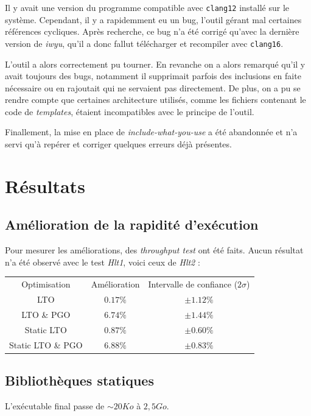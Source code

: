 \documentclass[a4paper]{report}
\begin{document}
Il y avait une version du programme compatible avec \verb'clang12' installé sur le système.
Cependant, il y a rapidemment eu un bug, l'outil gérant mal certaines références cycliques.
Après recherche, ce bug n'a été corrigé qu'avec la dernière version de \emph{iwyu}, qu'il a donc fallut télécharger et recompiler avec \verb'clang16'.

L'outil a alors correctement pu tourner.
En revanche on a alors remarqué qu'il y avait toujours des bugs, notamment il supprimait parfois des inclusions en faite nécessaire ou en rajoutait qui ne servaient pas directement.
De plus, on a pu se rendre compte que certaines architecture utilisés, comme les fichiers contenant le code de \emph{templates}, étaient incompatibles avec le principe de l'outil.

Finallement, la mise en place de \emph{include-what-you-use} a été abandonnée et n'a servi qu'à repérer et corriger quelques erreurs déjà présentes.

\chapter{Résultats}

\section{Amélioration de la rapidité d'exécution}
Pour mesurer les améliorations, des \emph{throughput test} ont été faits.
Aucun résultat n'a été observé avec le test \emph{Hlt1}, voici ceux de \emph{Hlt2} :

\begin{center}
    \begin{tabular}{ c c c }
        Optimisation      & Amélioration & Intervalle de confiance ($2\sigma$) \\
        LTO               & $0.17\%$     & $\pm 1.12\%$                        \\
        LTO \& PGO        & $6.74\%$     & $\pm 1.44\%$                        \\
        Static LTO        & $0.87\%$     & $\pm 0.60\%$                        \\
        Static LTO \& PGO & $6.88\%$     & $\pm 0.83\%$
    \end{tabular}
\end{center}

\section{Bibliothèques statiques}
L'exécutable final passe de $\sim 20 Ko$ à $2,5 Go$.
\end{document}
